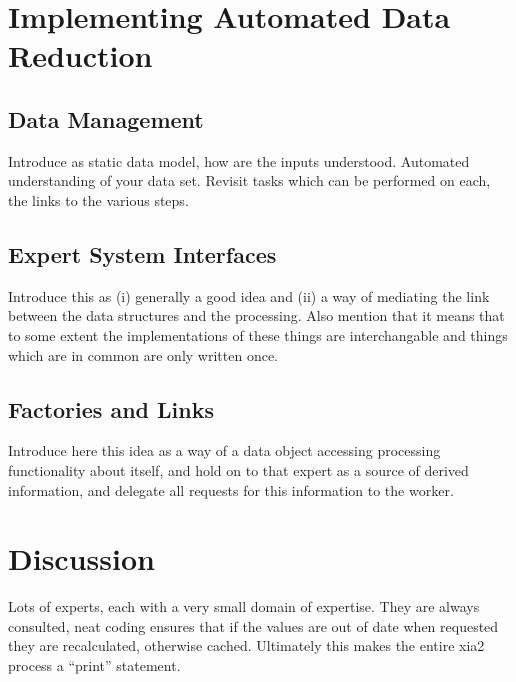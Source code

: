 \documentclass[a4paper,11pt]{article}
\begin{document}
\section{Implementing Automated Data Reduction}

\subsection{Data Management}

Introduce as static data model, how are the inputs
understood. Automated understanding of your data set. Revisit tasks
which can be performed on each, the links to the various steps.

\subsection{Expert System Interfaces}

Introduce this as (i) generally a good idea and (ii) a way of
mediating the link between the data structures and the
processing. Also mention that it means that to some extent the
implementations of these things are interchangable and things which
are in common are only written once.

\subsection{Factories and Links}

Introduce here this idea as a way of a data object accessing
processing functionality about itself, and hold on to that expert as a
source of derived information, and delegate all requests for this
information to the worker.

\section{Discussion}

Lots of experts, each with a very small domain of expertise. They are
always consulted, neat coding ensures that if the values are out of
date when requested they are recalculated, otherwise
cached. Ultimately this makes the entire xia2 process a ``print'' statement.
\end{document}
